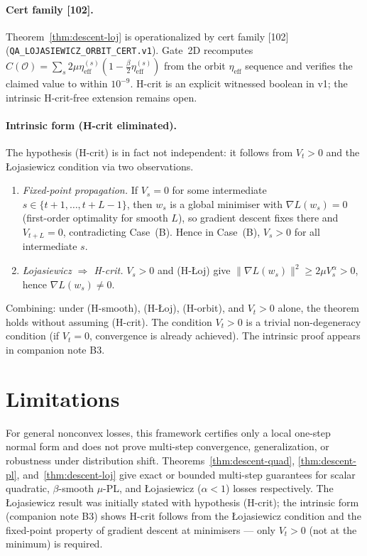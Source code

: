 \documentclass[11pt]{article}
\theoremstyle{definition}
\theoremstyle{remark}
\newcommand{\etaeff}{\eta_{\mathrm{eff}}}
\begin{document}
\paragraph{Cert family [102].}
Theorem~\ref{thm:descent-loj} is operationalized by cert family [102]
(\texttt{QA\_LOJASIEWICZ\_ORBIT\_CERT.v1}). Gate~2D recomputes
$C(\mathcal{O})=\sum_s 2\mu\etaeff^{(s)}(1-\tfrac{\beta}{2}\etaeff^{(s)})$ from
the orbit $\eta_{\mathrm{eff}}$ sequence and verifies the claimed value to within
$10^{-9}$. H-crit is an explicit witnessed boolean in v1; the intrinsic
H-crit-free extension remains open.

\paragraph{Intrinsic form (H-crit eliminated).}
The hypothesis (H-crit) is in fact not independent: it follows from $V_t>0$ and the
\L{}ojasiewicz condition via two observations.
\begin{enumerate}
\item \emph{Fixed-point propagation.} If $V_s=0$ for some intermediate
  $s\in\{t+1,\ldots,t+L-1\}$, then $w_s$ is a global minimiser with $\nabla L(w_s)=0$
  (first-order optimality for smooth $L$), so gradient descent fixes there and
  $V_{t+L}=0$, contradicting Case~(B). Hence in Case~(B), $V_s>0$ for all
  intermediate $s$.
\item \emph{\L{}ojasiewicz $\Rightarrow$ H-crit.} $V_s>0$ and (H-\L{}oj) give
  $\|\nabla L(w_s)\|^2\geq 2\mu V_s^\alpha>0$, hence $\nabla L(w_s)\neq 0$.
\end{enumerate}
Combining: under (H-smooth), (H-\L{}oj), (H-orbit), and $V_t>0$ alone, the theorem
holds without assuming (H-crit). The condition $V_t>0$ is a trivial non-degeneracy
condition (if $V_t=0$, convergence is already achieved). The intrinsic proof appears
in companion note B3.

\section{Limitations}

For general nonconvex losses, this framework certifies only a local one-step normal
form and does not prove multi-step convergence, generalization, or robustness under
distribution shift. Theorems~\ref{thm:descent-quad}, \ref{thm:descent-pl},
and~\ref{thm:descent-loj} give exact or bounded multi-step guarantees for scalar
quadratic, $\beta$-smooth $\mu$-PL, and \L{}ojasiewicz ($\alpha<1$) losses
respectively. The \L{}ojasiewicz result was initially stated with hypothesis (H-crit);
the intrinsic form (companion note B3) shows H-crit follows from the \L{}ojasiewicz
condition and the fixed-point property of gradient descent at minimisers --- only
$V_t>0$ (not at the minimum) is required.
\end{document}
